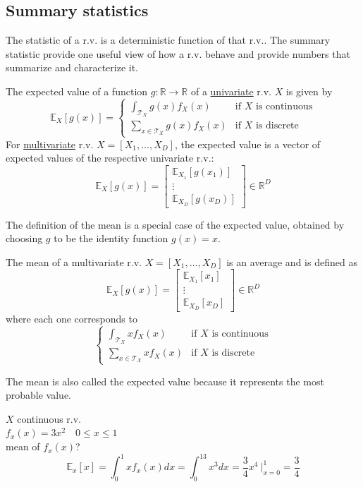 \documentclass{article}
\begin{document}
\subsection{Summary statistics}
The statistic of a r.v. is a deterministic function of that r.v.. The summary
statistic provide one useful view of how a r.v. behave and provide
numbers that summarize and characterize it.

\begin{definition}
    The expected value of a function $g:\mathbb{R}\to \mathbb{R}$ of a
    \underline{univariate} r.v. $X$ is given by
    $$\mathbb{E}_X[g(x)]=\begin{cases}
        \int_{\mathcal{T}_X}g(x)f_X(x) & \text{if }X\text{ is continuous}\\ 
        \sum_{x\in\mathcal{T}_X} g(x)f_X(x) & \text{if }X\text{ is discrete}
    \end{cases}$$
    For \underline{multivariate} r.v. $X=[X_1,\ldots,X_D]$, the
    expected value is a vector of expected values of the respective univariate
    r.v.: 
    $$
    \mathbb{E}_X[g(x)]=\begin{bmatrix}
        \mathbb{E}_{X_1}[g(x_1)]\\
        \vdots\\
        \mathbb{E}_{X_D}[g(x_D)]
    \end{bmatrix}\in \mathbb{R}^D
    $$
\end{definition}
The definition of the mean is a special case of the expected value, obtained
by choosing $g$ to be the identity function $g(x)=x$.
\begin{definition}[Mean]
    The mean of a multivariate r.v. $X=[X_1,\ldots,X_D]$ is an average and is
    defined as 
    $$
    \mathbb{E}_X[g(x)]=\begin{bmatrix}
        \mathbb{E}_{X_1}[x_1]\\
        \vdots\\
        \mathbb{E}_{X_D}[x_D]
    \end{bmatrix}\in \mathbb{R}^D
    $$
    where each one corresponds to 
    $$\begin{cases}
        \int_{\mathcal{T}_X}xf_X(x) & \text{if }X\text{ is continuous}\\ 
        \sum_{x\in\mathcal{T}_X} xf_X(x) & \text{if }X\text{ is discrete}
    \end{cases}$$
\end{definition}
The mean is also called the expected value because it represents the most
probable value.
\begin{example}
    $X$ continuous r.v.\\ 
    $f_x(x)=3x^2\quad0\leq x\leq1$\\ 
    mean of $f_x(x)$?
    $$
        \mathbb{E}_x[x]=\int_0^1xf_x(x)dx=\int_0^13x^3dx=\frac{3}{4}x^4\ |_{x=0}^1=\frac{3}{4}
    $$
\end{example}
\end{document}
